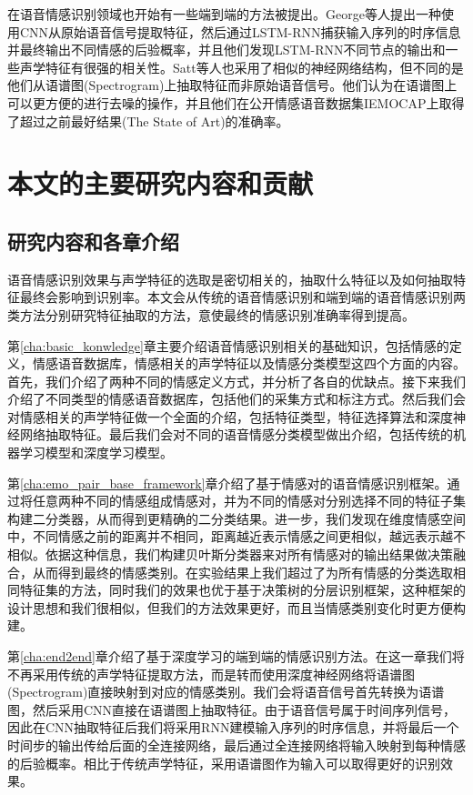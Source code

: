 在语音情感识别领域也开始有一些端到端的方法被提出。George等人提出一种使用CNN从原始语音信号提取特征，然后通过LSTM-RNN捕获输入序列的时序信息并最终输出不同情感的后验概率，并且他们发现LSTM-RNN不同节点的输出和一些声学特征有很强的相关性。Satt等人也采用了相似的神经网络结构，但不同的是他们从语谱图(Spectrogram)上抽取特征而非原始语音信号。他们认为在语谱图上可以更方便的进行去噪的操作，并且他们在公开情感语音数据集IEMOCAP上取得了超过之前最好结果(The State of Art)的准确率。

\section{本文的主要研究内容和贡献}
\label{sec:content_contribution}

\subsection{研究内容和各章介绍}
\label{ssec:content}
语音情感识别效果与声学特征的选取是密切相关的，抽取什么特征以及如何抽取特征最终会影响到识别率。本文会从传统的语音情感识别和端到端的语音情感识别两类方法分别研究特征抽取的方法，意使最终的情感识别准确率得到提高。

 第\ref{cha:basic_konwledge}章主要介绍语音情感识别相关的基础知识，包括情感的定义，情感语音数据库，情感相关的声学特征以及情感分类模型这四个方面的内容。首先，我们介绍了两种不同的情感定义方式，并分析了各自的优缺点。接下来我们介绍了不同类型的情感语音数据库，包括他们的采集方式和标注方式。然后我们会对情感相关的声学特征做一个全面的介绍，包括特征类型，特征选择算法和深度神经网络抽取特征。最后我们会对不同的语音情感分类模型做出介绍，包括传统的机器学习模型和深度学习模型。

 第\ref{cha:emo_pair_base_framework}章介绍了基于情感对的语音情感识别框架。通过将任意两种不同的情感组成情感对，并为不同的情感对分别选择不同的特征子集构建二分类器，从而得到更精确的二分类结果。进一步，我们发现在维度情感空间中，不同情感之前的距离并不相同，距离越近表示情感之间更相似，越远表示越不相似。依据这种信息，我们构建贝叶斯分类器来对所有情感对的输出结果做决策融合，从而得到最终的情感类别。在实验结果上我们超过了为所有情感的分类选取相同特征集的方法，同时我们的效果也优于基于决策树的分层识别框架，这种框架的设计思想和我们很相似，但我们的方法效果更好，而且当情感类别变化时更方便构建。

 第\ref{cha:end2end}章介绍了基于深度学习的端到端的情感识别方法。在这一章我们将不再采用传统的声学特征提取方法，而是转而使用深度神经网络将语谱图(Spectrogram)直接映射到对应的情感类别。我们会将语音信号首先转换为语谱图，然后采用CNN直接在语谱图上抽取特征。由于语音信号属于时间序列信号，因此在CNN抽取特征后我们将采用RNN建模输入序列的时序信息，并将最后一个时间步的输出传给后面的全连接网络，最后通过全连接网络将输入映射到每种情感的后验概率。相比于传统声学特征，采用语谱图作为输入可以取得更好的识别效果。
 
